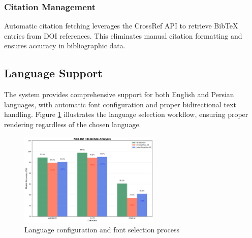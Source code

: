 \subsubsection{Citation Management}

Automatic citation fetching leverages the CrossRef API to retrieve BibTeX entries from DOI references. This eliminates manual citation formatting and ensures accuracy in bibliographic data.

\subsection{Language Support}

The system provides comprehensive support for both English and Persian languages, with automatic font configuration and proper bidirectional text handling. Figure \ref{fig:sample2} illustrates the language selection workflow, ensuring proper rendering regardless of the chosen language.

\begin{figure}[htbp]
    \centering
    \includegraphics[width=0.6\textwidth]{figures/fig2.png}
    \caption{Language configuration and font selection process}
    \label{fig:sample2}
\end{figure} 